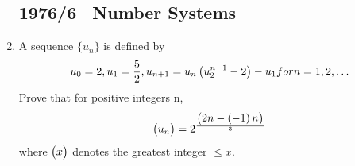 \documentclass{article}
\begin{document}
\begin{enumerate}
\subsection*{1976/6 \ Number Systems}
				\item A sequence $\{u_{n}\}$ is defined by\begin{align}u_{0} = 2, u_{1} = \frac{5}{2}, u_{n+1} = u_{n}\left(u_{2}^{n-1} - 2\right) - u_{1}for n = 1, 2, \ldots \end{align} Prove that for positive integers n,\begin{align} \begin{pmatrix}u_{n}\end{pmatrix} = 2^{\frac{\begin{pmatrix}2n-\left(-1\right)n\end{pmatrix}}{3}}\end{align}where $\begin{pmatrix}x\end{pmatrix}$ denotes the greatest integer $\leq x$.
\end{enumerate}
\end{document}
